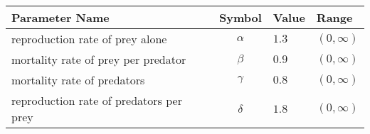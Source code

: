 \begin{tabular}{lcll}
\hline
 Parameter Name                          &  Symbol  & Value   & Range         \\
\hline
 reproduction rate of prey alone         & $\alpha$ & $1.3$   & $(0, \infty)$ \\
 mortality rate of prey per predator     & $\beta$  & $0.9$   & $(0, \infty)$ \\
 mortality rate of predators             & $\gamma$ & $0.8$   & $(0, \infty)$ \\
 reproduction rate of predators per prey & $\delta$ & $1.8$   & $(0, \infty)$ \\
\hline
\end{tabular}